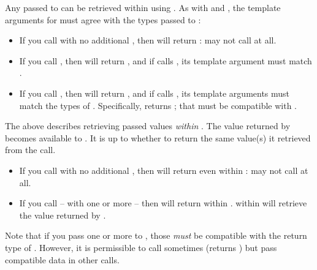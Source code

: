 Any  passed to \resumewith can be retrieved within 
using \getdata. As with \callcc and \resume, the template arguments
for \getdata must agree with the types passed to \resumewith:

\begin{itemize}
  \item If you call  with no additional ,
  then \dataavail will return :  may not call \getdata at
  all.
  \item If you call , then \dataavail
  will return , and if  calls \getdata, its template
  argument must match .
  \item If you call ,
  then \dataavail will return , and if  calls \getdata,
  its template arguments must match the types of .
  Specifically,  returns ;
  that  must be compatible
  with .
\end{itemize}

The above describes retrieving passed values \emph{within} . The
value returned by  becomes available to .
It is up to  whether to return the same value(s) it retrieved from
the \resumewith call.

\begin{itemize}
  \item If you call  with no additional ,
  then \dataavail will return  even
  within :  may not call \getdata at all.
  \item If you call  -- with one or
  more  -- then \dataavail will return 
  within . \getdata within  will retrieve
  the value returned by .
\end{itemize}

Note that if you pass one or more  to \resumewith,
those  \emph{must} be compatible with the return type
of . However, it is permissible to call 
sometimes (\dataavail returns ) but pass compatible data in
other \resumewith calls.\\

